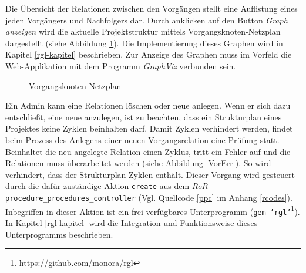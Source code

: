 \documentclass[a4paper,12pt,parskip,bibtotoc,liststotoc]{article}
\begin{document}
Die Übersicht der Relationen zwischen den Vorgängen stellt eine Auflistung eines jeden Vorgängers und Nachfolgers dar. Durch anklicken auf den Button \textit{Graph anzeigen} wird die aktuelle Projektstruktur mittels Vorgangsknoten-Netzplan dargestellt (siehe Abbildung \ref{Graphp}). Die Implementierung dieses Graphen wird in Kapitel \ref{rgl-kapitel} beschrieben. Zur Anzeige des Graphen muss im Vorfeld die Web-Applikation mit dem Programm \textit{GraphViz} verbunden sein.\\
\begin{figure}[h!]
  \begin{center}
    \caption{Vorgangsknoten-Netzplan}  \label{Graphp}
  \end{center}
\end{figure}

Ein Admin kann eine Relationen löschen oder neue anlegen. Wenn er sich dazu entschließt, eine neue anzulegen, ist zu beachten, dass ein Strukturplan eines Projektes keine Zyklen beinhalten darf. Damit Zyklen verhindert werden, findet beim Prozess des Anlegens einer neuen Vorgangsrelation eine Prüfung statt. Beinhaltet die neu angelegte Relation einen Zyklus, tritt ein Fehler auf und die Relationen muss überarbeitet werden (siehe Abbildung \ref{VorErr}). So wird verhindert, dass der Strukturplan Zyklen enthält. Dieser Vorgang wird gesteuert durch die dafür zuständige Aktion \texttt{create} aus dem \textit{RoR} \texttt{procedure\_procedures\_controller} (Vgl. Quellcode \ref{ppc} im Anhang \ref{rcodes}). Inbegriffen in dieser Aktion ist ein frei-verfügbares Unterprogramm (\texttt{gem 'rgl'}\footnote{https://github.com/monora/rgl}). In Kapitel \ref{rgl-kapitel} wird die Integration und Funktionsweise dieses Unterprogramms beschrieben. \\
\end{document}
